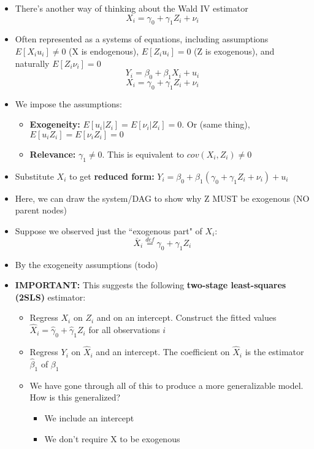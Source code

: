 \documentclass[10pt, oneside]{article}
\begin{document}
\begin{itemize}
    \item There's another way of thinking about the Wald IV estimator
    \[X_i = \gamma_0 + \gamma_1 Z_i + \nu_i\]
    \item Often represented as a systems of equations, including assumptions $E[X_i u_i] \neq 0$ (X is endogenous), $E[Z_i u_i ] = 0$ (Z is exogenous), and naturally $E[Z_i \nu_i] = 0$
    \[Y_i = \beta_0 + \beta_1 X_i + u_i\]
    \[X_i = \gamma_0 + \gamma_1 Z_i +\nu_i\]
    \item We impose the assumptions:
    \begin{itemize}
        \item \textbf{Exogeneity:} $E[u_i | Z_i] = E[\nu_i | Z_i] = 0$. Or (same thing), $E[u_iZ_i] = E[\nu_i Z_i ] = 0$
        \item \textbf{Relevance:} $\gamma_1 \neq 0$. This is equivalent to $cov(X_i, Z_i) \neq 0$
    \end{itemize}
    \item Substitute $X_i$ to get \textbf{reduced form:} $Y_i = \beta_0 + \beta_1 (\gamma_0 + \gamma_1 Z_i + \nu _i ) + u_i$
    \item Here, we can draw the system/DAG to show why Z MUST be exogenous (NO parent nodes)
    \item Suppose we observed just the ``exogenous part" of $X_i$: \[\bar X_i \overset{def}{=} \gamma_0 + \gamma_1 Z_i\]
    \item By the exogeneity assumptions (todo)
    \item \textbf{IMPORTANT:} This suggests the following \textbf{two-stage least-squares (2SLS)} estimator:
    \begin{itemize}
        \item Regress $X_i$ on $Z_i$ and on an intercept. Construct the fitted values $\hat X_i = \hat \gamma_0 + \hat \gamma_1 Z_i$ for all observations $i$
        \item Regress $Y_i$ on $\hat X_i$ and an intercept. The coefficient on $\hat X_i$ is the estimator $\hat \beta_1$ of $\beta_1$
        \item We have gone through all of this to produce a more generalizable model. How is this generalized?
        \begin{itemize}
            \item We include an intercept
            \item We don't require X to be exogenous
            \begin{itemize}

\end{itemize}
\end{itemize}
\end{itemize}
\end{itemize}
\end{document}

